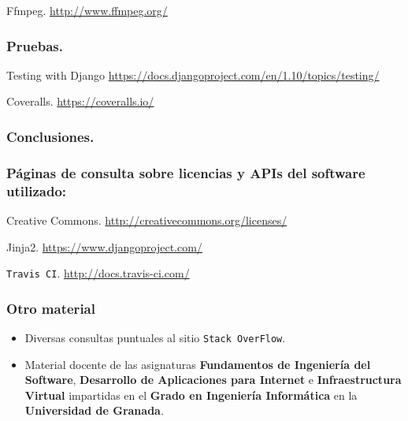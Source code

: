  Ffmpeg. \url{http://www.ffmpeg.org/}

\subsubsection*{Pruebas.}

 Testing with Django \url{https://docs.djangoproject.com/en/1.10/topics/testing/}

 Coveralls. \url{https://coveralls.io/}

\subsubsection*{Conclusiones.}

\subsubsection*{Páginas de consulta sobre licencias y APIs del software utilizado:}
 Creative Commons. \url{http://creativecommons.org/licenses/}

 Jinja2. \url{https://www.djangoproject.com/}

 {\tt Travis CI}. \url{http://docs.travis-ci.com/}

\bigskip


\subsubsection*{Otro material}
\begin{itemize}
	\item Diversas consultas puntuales al sitio {\tt Stack OverFlow}.
	\item Material docente de las asignaturas \textbf{Fundamentos de Ingeniería del Software}, \textbf{Desarrollo de Aplicaciones para Internet} e \textbf{Infraestructura Virtual} impartidas en el \textbf{Grado en Ingeniería Informática} en la \textbf{Universidad de Granada}.
\end{itemize}
